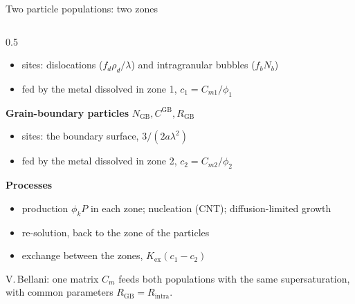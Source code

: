 \documentclass[aspectratio=169,10pt]{beamer}
\newcommand{\NEW}[1]{\textcolor{new}{#1}}
\begin{document}
\begin{frame}{Two particle populations: two zones}
\begin{columns}[T]
\begin{column}{0.5\textwidth}
\begin{itemize}
        \item sites: dislocations ($f_d\rho_d/\lambda$) and intragranular bubbles ($f_b N_b$)
        \item fed by the metal dissolved in \NEW{zone 1, $c_1 = C_{m1}/\phi_1$}
      \end{itemize}
      \medskip
      \textbf{Grain-boundary particles} $N_{\mathrm{GB}}, C^{\mathrm{GB}}, R_{\mathrm{GB}}$
      \begin{itemize}\footnotesize
        \item sites: the boundary surface, $3/(2a\lambda^2)$
        \item fed by the metal dissolved in \NEW{zone 2, $c_2 = C_{m2}/\phi_2$}
      \end{itemize}
      \medskip
      \textbf{Processes}
      \begin{itemize}\footnotesize
        \item production \NEW{$\phi_k P$ in each zone}; nucleation (CNT); diffusion-limited growth
        \item re-solution, back \NEW{to the zone of the particles}
        \item \NEW{exchange between the zones, $K_{\mathrm{ex}}(c_1 - c_2)$}
      \end{itemize}
      \medskip
      {\footnotesize V.\,Bellani: one matrix $C_m$ feeds both populations with the same supersaturation, with common parameters $R_{\mathrm{GB}} = R_{\mathrm{intra}}$.}
    \end{column}
  \end{columns}
\end{frame}
\end{document}
